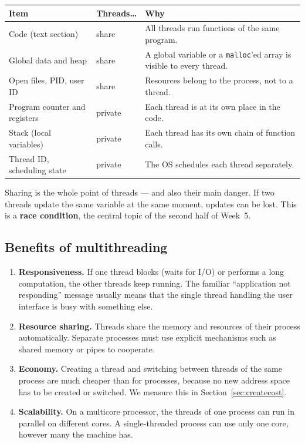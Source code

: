 \documentclass[11pt,a4paper]{article}
\newcommand{\term}[1]{\textbf{\color{mintdeep}#1}}
\newcommand{\cmd}[1]{\texttt{#1}}
\begin{document}
\begin{center}
\renewcommand{\arraystretch}{1.3}
\begin{tabularx}{\linewidth}{>{\raggedright\arraybackslash}p{4.4cm} l >{\raggedright\arraybackslash}X}
\toprule
\textbf{Item} & \textbf{Threads\dots} & \textbf{Why} \\
\midrule
Code (text section) & share & All threads run functions of the same program. \\
Global data and heap & share & A global variable or a \cmd{malloc}'ed array is visible to every thread. \\
Open files, PID, user ID & share & Resources belong to the process, not to a thread. \\
Program counter and registers & private & Each thread is at its own place in the code. \\
Stack (local variables) & private & Each thread has its own chain of function calls. \\
Thread ID, scheduling state & private & The OS schedules each thread separately. \\
\bottomrule
\end{tabularx}
\end{center}

Sharing is the whole point of threads --- and also their main danger. If two threads update the same variable at the same moment, updates can be lost. This is a \term{race condition}, the central topic of the second half of Week~5.

\subsection{Benefits of multithreading}

\begin{enumerate}[leftmargin=1.4em]
  \item \textbf{Responsiveness.} If one thread blocks (waits for I/O) or performs a long computation, the other threads keep running. The familiar ``application not responding'' message usually means that the single thread handling the user interface is busy with something else.
  \item \textbf{Resource sharing.} Threads share the memory and resources of their process automatically. Separate processes must use explicit mechanisms such as shared memory or pipes to cooperate.
  \item \textbf{Economy.} Creating a thread and switching between threads of the same process are much cheaper than for processes, because no new address space has to be created or switched. We measure this in Section~\ref{sec:createcost}.
  \item \textbf{Scalability.} On a multicore processor, the threads of one process can run in parallel on different cores. A single-threaded process can use only one core, however many the machine has.
\end{enumerate}
\end{document}
